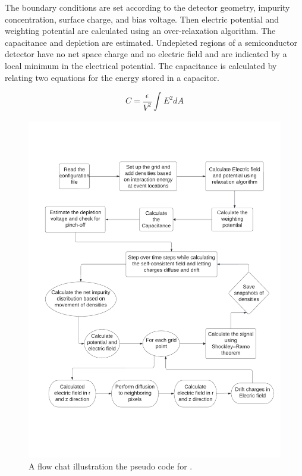 The boundary conditions are set according to the detector geometry, impurity concentration, surface charge, and bias voltage. Then electric potential and weighting potential are calculated using an over-relaxation algorithm. The capacitance and depletion are estimated. Undepleted regions of a semiconductor detector have no net space charge and no electric field and are indicated by a local minimum in the electrical potential. The capacitance is calculated by relating two equations for the energy stored in a capacitor.

\begin{equation}\label{capacitance_eq}
C= \frac{\epsilon}{V^2} \int_{}^{} E^2 dA
\end{equation}

\begin{figure}[!htb]
\centering
\includegraphics[width=0.99\linewidth,trim={2pc 10pc 1.5pc 9pc},clip]{ch3/figs/ehd_flowchart.pdf}
\caption{A flow chat illustration the pseudo code for {\tdsim}.}
\label{fig:ehd_flowchart}
\end{figure}


